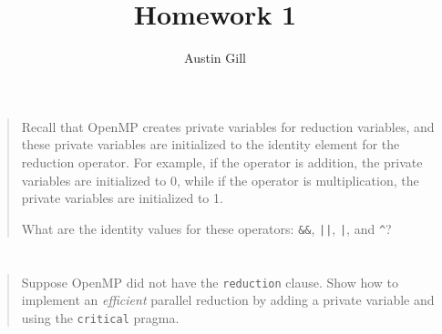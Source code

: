 \documentclass{article}
\title{Homework 1}
\author{Austin Gill}
\begin{document}
\maketitle

\section{}
    \begin{quote}
        Recall that OpenMP creates private variables for reduction variables, and these private variables are initialized to the identity element for the reduction operator. For example, if the operator is addition, the private variables are initialized to 0, while if the operator is multiplication, the private variables are initialized to 1.

        What are the identity values for these operators: \texttt{&&}, \texttt{||}, \texttt{|}, and \texttt{^}?
    \end{quote}

\section{}
    \begin{quote}
        Suppose OpenMP did not have the \texttt{reduction} clause. Show how to implement an \textit{efficient} parallel reduction by adding a private variable and using the \texttt{critical} pragma.
    \end{quote}
\end{document}
